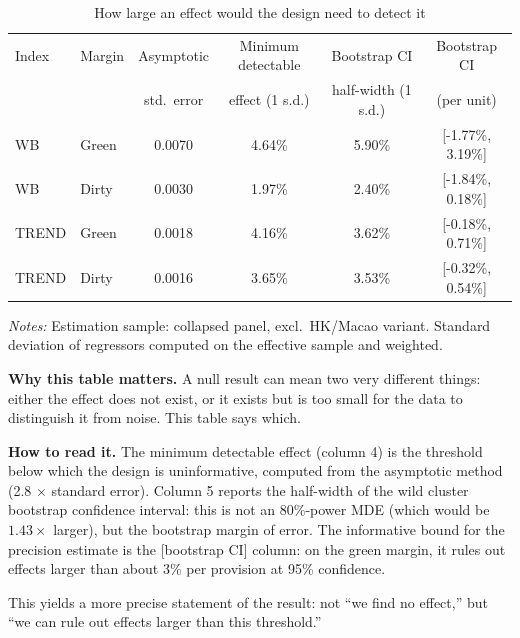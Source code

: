 \documentclass{article}
\begin{document}
\begin{table}[htbp]
\centering
\footnotesize
\caption{How large an effect would the design need to detect it}
\label{tab:mde}
\begin{threeparttable}
\begin{tabular}{llcccc}
\toprule
Index & Margin & Asymptotic & Minimum detectable & Bootstrap CI & Bootstrap CI \\
 & & std.\ error & effect (1 s.d.) & half-width (1 s.d.) & (per unit) \\
\midrule
WB & Green & 0.0070 & 4.64\% & 5.90\% & [-1.77\%, 3.19\%] \\
WB & Dirty & 0.0030 & 1.97\% & 2.40\% & [-1.84\%, 0.18\%] \\
TREND & Green & 0.0018 & 4.16\% & 3.62\% & [-0.18\%, 0.71\%] \\
TREND & Dirty & 0.0016 & 3.65\% & 3.53\% & [-0.32\%, 0.54\%] \\
\bottomrule
\end{tabular}
\begin{tablenotes}[flushleft]\footnotesize
\item \emph{Notes:} Estimation sample: collapsed panel, excl.\ HK/Macao variant. Standard deviation of regressors computed on the effective sample and weighted.
\item \textbf{Why this table matters.} A null result can mean two very different things: either the effect does not exist, or it exists but is too small for the data to distinguish it from noise. This table says which.
\item \textbf{How to read it.} The minimum detectable effect (column 4) is the threshold below which the design is uninformative, computed from the asymptotic method (2.8 $\times$ standard error). Column 5 reports the half-width of the wild cluster bootstrap confidence interval: this is not an 80\%-power MDE (which would be $1.43\times$ larger), but the bootstrap margin of error. The informative bound for the precision estimate is the [bootstrap CI] column: on the green margin, it rules out effects larger than about 3\% per provision at 95\% confidence.
\item This yields a more precise statement of the result: not ``we find no effect,'' but ``we can rule out effects larger than this threshold.''
\end{tablenotes}
\end{threeparttable}
\end{table}


\newpage
\end{document}
